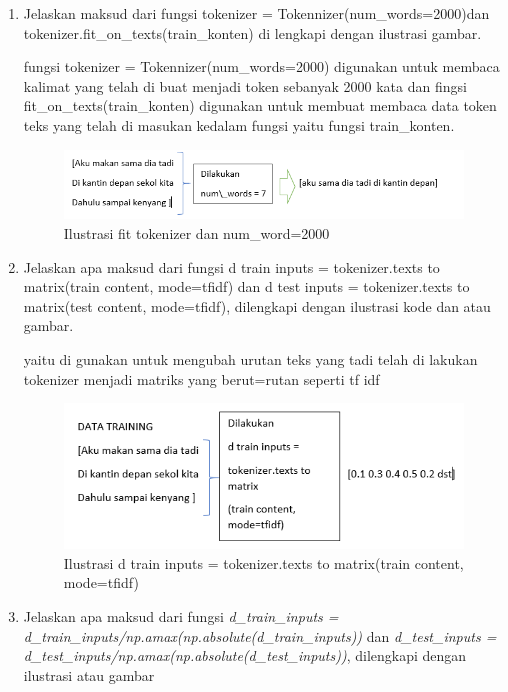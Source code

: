 \begin{enumerate}
\item Jelaskan maksud dari fungsi tokenizer = Tokennizer(num\_words=2000)dan tokenizer.fit\_on\_texts(train\_konten) di lengkapi dengan ilustrasi gambar.\par
fungsi tokenizer = Tokennizer(num\_words=2000) digunakan untuk membaca kalimat yang telah di buat menjadi token sebanyak 2000 kata dan fingsi fit\_on\_texts(train\_konten) digunakan untuk membuat membaca data token teks yang telah di masukan kedalam fungsi yaitu fungsi train\_konten.
\begin{figure}[ht]
\centering
\includegraphics[scale=0.4]{figures/1174042/chapter7/1,5.PNG}
\caption{Ilustrasi fit tokenizer dan num\_word=2000}
\label{Contoh}
\end{figure}


\item Jelaskan apa maksud dari fungsi d train inputs = tokenizer.texts to matrix(train content, mode=tfidf) dan d test inputs = tokenizer.texts to matrix(test content, mode=tfidf), dilengkapi dengan ilustrasi kode dan atau gambar.\par 
yaitu di gunakan untuk mengubah urutan teks yang tadi telah di lakukan tokenizer menjadi matriks yang berut=rutan seperti tf idf 
\begin{figure}[ht]
\centering
\includegraphics[scale=0.4]{figures/1174042/chapter7/1,6.PNG}
\caption{Ilustrasi d train inputs = tokenizer.texts to matrix(train content, mode=tfidf)}
\label{Contoh}
\end{figure}


\item Jelaskan apa maksud dari fungsi \emph{d\_train\_inputs = d\_train\_inputs/np.amax(np.absolute(d\_train\_inputs))} dan \emph{d\_test\_inputs = d\_test\_inputs/np.amax(np.absolute(d\_test\_inputs))}, dilengkapi dengan ilustrasi atau gambar \par


\end{enumerate}
